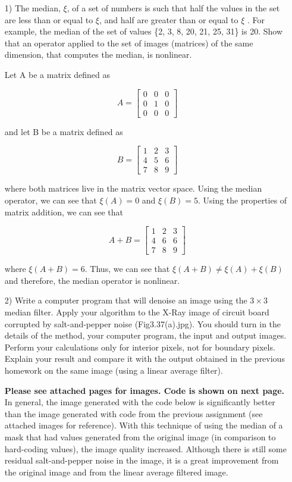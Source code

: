 \documentclass{article}
\begin{document}
\begin{enumerate}

\item[1)] The median, $\xi$, of a set of numbers is such that half the values in the set are less
than or equal to $\xi$, and half are greater than or equal to $\xi$ . For example, the median of the
set of values \{2, 3, 8, 20, 21, 25, 31\} is 20. Show that an operator applied to the set of images
(matrices) of the same dimension, that computes the median, is nonlinear.

Let A be a matrix defined as

\[
A=
	\begin{bmatrix}
		0 & 0 & 0 \\
		0 & 1 & 0 \\
		0 & 0 & 0
	\end{bmatrix}
\]

and let B be a matrix defined as 

\[
B=
	\begin{bmatrix}
		1 & 2 & 3 \\
		4 & 5 & 6 \\
		7 & 8 & 9
	\end{bmatrix}
\]

where both matrices live in the matrix vector space.  Using the median operator, we can see that
$\xi (A) = 0$ and $\xi(B) = 5$.  Using the properties of matrix addition, we can see that 

\[
A+B =
	\begin{bmatrix}
		1 & 2 & 3 \\
		4 & 6 & 6 \\
		7 & 8 & 9
	\end{bmatrix}
\]

where $\xi (A+B) = 6$.  Thus, we can see that  $\xi (A+B) \neq \xi (A) + \xi(B) $ and therefore, the median operator
is nonlinear.

\item[2)] Write a computer program that will denoise an image using the $3 \times 3$ median filter.
Apply your algorithm to the X-Ray image of circuit board corrupted by salt-and-pepper noise
(Fig3.37(a).jpg). You should turn in the details of the method, your computer program,
the input and output images. Perform your calculations only for interior pixels, not for
boundary pixels. Explain your result and compare it with the output obtained in the previous
homework on the same image (using a linear average filter).

\textbf{Please see attached pages for images. Code is shown on next page.} \vspace{0.1in}\newline
In general, the image generated with the code below is significantly better than the image generated with code from the previous assignment
(see attached images for reference).  With this technique of using the median of a mask that had values generated from the original image (in comparison
to hard-coding values), the image quality increased.  Although there is still some residual salt-and-pepper noise in the image, it is a great improvement from
the original image and from the linear average filtered image.


\end{enumerate}
\end{document}
